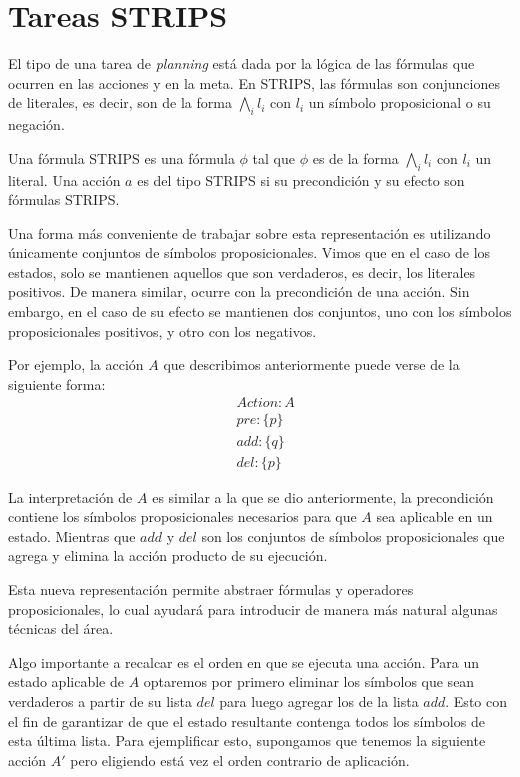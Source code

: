\section{Tareas STRIPS}

El tipo de una tarea de \emph{planning} está dada por la lógica de las fórmulas
que ocurren en las acciones y en la meta. En STRIPS, las fórmulas son conjunciones de literales, es decir, son de la forma $\bigwedge_i l_i$ con $l_i$
un símbolo proposicional o su negación.

\begin{mydef}
    Una fórmula STRIPS es una fórmula $\phi$ tal que $\phi$ es de la forma $\bigwedge_i l_i$ con $l_i$ un literal.
    Una acción $a$ es del tipo STRIPS si su precondición y su efecto son fórmulas
    STRIPS.
\end{mydef}

Una forma más conveniente de trabajar sobre esta representación es utilizando
únicamente conjuntos de símbolos proposicionales. Vimos que en el caso de los
estados, solo se mantienen aquellos que son verdaderos, es decir, los
literales positivos. De manera similar, ocurre con la precondición de una
acción. Sin embargo, en el caso de su efecto se mantienen dos conjuntos, uno
con los símbolos proposicionales positivos, y otro con los negativos.

Por ejemplo, la acción $A$ que describimos anteriormente puede verse
de la siguiente forma:
\begin{align*}
    & Action : A \\
    & pre : \{ p \}\\
    & add : \{ q \}\\
    & del : \{ p \}
\end{align*}

La interpretación de $A$ es similar a la que se dio anteriormente, la
precondición contiene los símbolos proposicionales necesarios para que $A$ sea
aplicable en un estado. Mientras que $add$ y $del$ son los conjuntos de símbolos
proposicionales que agrega y elimina la acción producto de su ejecución.

Esta nueva representación permite abstraer fórmulas y operadores
proposicionales, lo cual ayudará para introducir de manera más natural algunas
técnicas del área.

Algo importante a recalcar es el orden en que se ejecuta una acción. Para un estado aplicable de $A$ optaremos por primero eliminar los símbolos que sean verdaderos a partir de su lista $del$ para luego agregar los de la lista $add$. Esto con el fin de garantizar de que el estado resultante contenga todos los símbolos de esta última lista.
Para ejemplificar esto, supongamos que tenemos la siguiente acción $A'$ pero eligiendo está vez el orden contrario de aplicación.


